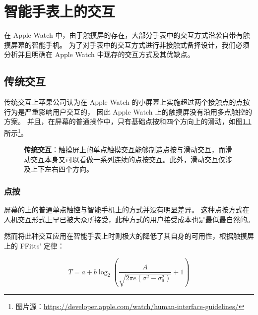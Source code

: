 \chapter{智能手表上的交互}

\quad\quad 在 Apple Watch 中，由于触摸屏的存在，大部分手表中的交互方式沿袭自带有触摸屏幕的智能手机\cite{WatchGuidelines:2016}。
为了对手表中的交互方式进行非接触式备择设计，我们必须分析并且明确在 Apple Watch 中现存的交互方式及其优缺点。

\section{传统交互}

传统交互上苹果公司认为在 Apple Watch 的小屏幕上实施超过两个接触点的点按行为是严重影响用户交互的，
因此 Apple Watch 上的触摸屏没有沿用多点触控的方案。
并且，在屏幕的普通操作中，只有基础点按和四个方向上的滑动，如图\ref{fig:gesture}所示\footnote{图片源：\url{https://developer.apple.com/watch/human-interface-guidelines/}}。

\begin{figure}[H]
    \kaishu
    \centering
    \caption{\textbf{传统交互}：触摸屏上的单点触摸交互能够制造点按与滑动交互，而滑动交互本身又可以看做一系列连续的点按交互。此外，滑动交互仅涉及上下左右四个方向。}
    \label{fig:gesture}
\end{figure}

\subsection{点按}

屏幕的上的普通单点触控与智能手机上的方式并没有明显差异。
这种点按方式在人机交互形式上早已被大众所接受，此种方式的用户接受成本也是最低最自然的。

然而将此种交互应用在智能手表上时则极大的降低了其自身的可用性，根据触摸屏上的 FFitts' 定律\cite{Bi:2013:FLM:2470654.2466180}：

\begin{equation}
T=a+b\log_{2}{\left(\frac{A}{\sqrt{2\pi e(\sigma^2-\sigma_{a}^2)}}+1 \right)}
\end{equation}

